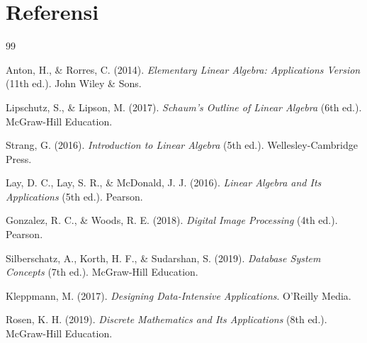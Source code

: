 \documentclass[11pt,a4paper]{article}
\begin{document}
\newpage
\section*{Referensi}

\begin{thebibliography}{99}

	Anton, H., \& Rorres, C. (2014).
	\textit{Elementary Linear Algebra: Applications Version} (11th ed.).
	John Wiley \& Sons.

	Lipschutz, S., \& Lipson, M. (2017).
	\textit{Schaum's Outline of Linear Algebra} (6th ed.).
	McGraw-Hill Education.

	Strang, G. (2016).
	\textit{Introduction to Linear Algebra} (5th ed.).
	Wellesley-Cambridge Press.

	Lay, D. C., Lay, S. R., \& McDonald, J. J. (2016).
	\textit{Linear Algebra and Its Applications} (5th ed.).
	Pearson.

	Gonzalez, R. C., \& Woods, R. E. (2018).
	\textit{Digital Image Processing} (4th ed.).
	Pearson.

	Silberschatz, A., Korth, H. F., \& Sudarshan, S. (2019).
	\textit{Database System Concepts} (7th ed.).
	McGraw-Hill Education.

	Kleppmann, M. (2017).
	\textit{Designing Data-Intensive Applications}.
	O'Reilly Media.

	Rosen, K. H. (2019).
	\textit{Discrete Mathematics and Its Applications} (8th ed.).
	McGraw-Hill Education.

\end{thebibliography}
\end{document}
